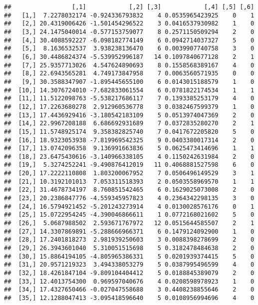 \documentclass[]{article}
\begin{document}
\begin{verbatim}
##                 [,1]            [,2] [,3]            [,4] [,5] [,6]
##   [1,]  7.2278032174 -0.924336793832    4 0.0535965423925    0    1
##   [2,] 20.4319006426 -1.501454296522    3 0.0416537930982    1    0
##   [3,] 24.1475040014 -0.577153759077    8 0.2571150509294    2    0
##   [4,] 30.4088592227 -6.098182774149    6 0.0942714037327    5    0
##   [5,]  8.1636532537  3.938238136470    6 0.0039907740758    3    0
##   [6,] 30.4486824374 -5.539952996187   14 0.1097840677128    2    1
##   [7,] 25.9357713026  4.547624890693    8 0.1558568389167    4    0
##   [8,] 22.6943565281  4.749173847958    7 0.0063560571935    0    0
##   [9,] 30.3588347907 -1.895445655100    6 0.0143015188579    1    0
##  [10,] 14.3076724010 -7.682833061554    6 0.0781822174534    1    1
##  [11,] 11.5122098763 -5.538217686117    7 0.1393385253179    4    0
##  [12,] 17.2263680278  2.912960536778    3 0.0382467599379    1    0
##  [13,] 17.4436929416 -3.180542183109    5 0.0513974047369    2    0
##  [14,] 22.9967208188  6.686692931689    7 0.0372835280270    2    1
##  [15,] 11.5748925174  9.358382825740    7 0.0417672205820    5    0
##  [16,] 18.9323053938 -7.819969542325    9 0.0403380017314    2    0
##  [17,] 13.0742096358  9.136991663836    5 0.0625473414696    1    1
##  [18,] 23.6475430616 -3.140966338105    4 0.1150242631984    2    0
##  [19,]  5.3274252241 -9.490876412019   11 0.4068881527598    6    0
##  [20,] 17.2222110808  1.803200067952    7 0.0506496149529    3    1
##  [21,] 10.3192101013  7.053311518393    2 0.0503558969570    1    1
##  [22,] 31.4678734197  8.760851542465    6 0.1629025073008    2    0
##  [23,] 20.2386847776 -4.559345957823    4 0.2364342298135    3    0
##  [24,] 16.5794921452 -5.201243273914    4 0.0130028576176    0    1
##  [25,] 15.0722954245 -4.390046866611    1 0.0772168021602    5    0
##  [26,]  5.0687988502  2.593671767972   12 0.0515644585507    2    1
##  [27,] 14.3307869891 -5.288666966371    6 0.1479124092900    1    0
##  [28,] 17.2401818273  2.981939250603    3 0.0088398278699    2    0
##  [29,] 26.3943601040  5.310051515698    5 0.3182478484638    2    0
##  [30,] 15.8864194105 -4.805965386331    5 0.0201939374415    5    0
##  [31,] 20.9571219323  3.494338053279    5 0.0387995496599    4    0
##  [32,] 18.4261847104 -9.809104404412    5 0.0188845389079    2    0
##  [33,] 12.4013754300  0.969597040676    4 0.0208598978923    1    0
##  [34,] 17.4327650466 -0.027047558688    3 0.4408238855646    2    0
##  [35,] 12.1288047413 -3.095418596640    5 0.0108956994696    4    0

\end{verbatim}
\end{document}

